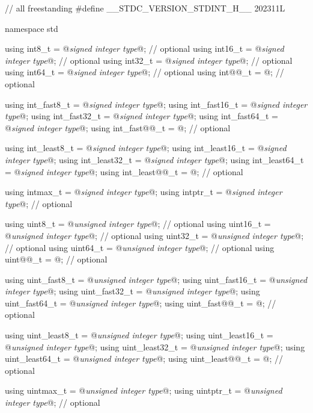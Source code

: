 \begin{codeblock}
// all freestanding
#define __STDC_VERSION_STDINT_H__ 202311L

namespace std {
  using int8_t         = @\textit{signed integer type}@;   // optional
  using int16_t        = @\textit{signed integer type}@;   // optional
  using int32_t        = @\textit{signed integer type}@;   // optional
  using int64_t        = @\textit{signed integer type}@;   // optional
  using int@@_t         = @\seebelow@;             // optional

  using int_fast8_t    = @\textit{signed integer type}@;
  using int_fast16_t   = @\textit{signed integer type}@;
  using int_fast32_t   = @\textit{signed integer type}@;
  using int_fast64_t   = @\textit{signed integer type}@;
  using int_fast@@_t    = @\seebelow@;             // optional

  using int_least8_t   = @\textit{signed integer type}@;
  using int_least16_t  = @\textit{signed integer type}@;
  using int_least32_t  = @\textit{signed integer type}@;
  using int_least64_t  = @\textit{signed integer type}@;
  using int_least@@_t   = @\seebelow@;             // optional

  using intmax_t       = @\textit{signed integer type}@;
  using intptr_t       = @\textit{signed integer type}@;   // optional

  using uint8_t        = @\textit{unsigned integer type}@; // optional
  using uint16_t       = @\textit{unsigned integer type}@; // optional
  using uint32_t       = @\textit{unsigned integer type}@; // optional
  using uint64_t       = @\textit{unsigned integer type}@; // optional
  using uint@@_t        = @\seebelow@;             // optional

  using uint_fast8_t   = @\textit{unsigned integer type}@;
  using uint_fast16_t  = @\textit{unsigned integer type}@;
  using uint_fast32_t  = @\textit{unsigned integer type}@;
  using uint_fast64_t  = @\textit{unsigned integer type}@;
  using uint_fast@@_t   = @\seebelow@;             // optional

  using uint_least8_t  = @\textit{unsigned integer type}@;
  using uint_least16_t = @\textit{unsigned integer type}@;
  using uint_least32_t = @\textit{unsigned integer type}@;
  using uint_least64_t = @\textit{unsigned integer type}@;
  using uint_least@@_t  = @\seebelow@;             // optional

  using uintmax_t      = @\textit{unsigned integer type}@;
  using uintptr_t      = @\textit{unsigned integer type}@; // optional
}


\end{codeblock}
